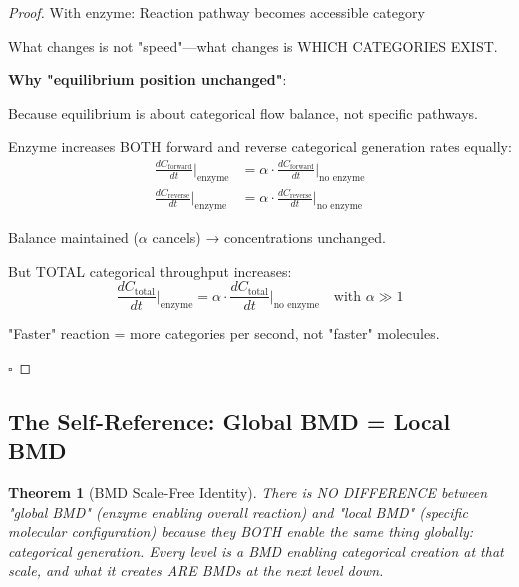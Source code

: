 \documentclass[12pt,a4paper]{article}
\newtheorem{theorem}{Theorem}[section]
\begin{document}
\begin{proof}
With enzyme: Reaction pathway becomes accessible category

What changes is not "speed"—what changes is WHICH CATEGORIES EXIST.

\textbf{Why "equilibrium position unchanged"}:

Because equilibrium is about categorical flow balance, not specific pathways.

Enzyme increases BOTH forward and reverse categorical generation rates equally:
\begin{align}
\frac{dC_{\text{forward}}}{dt}\Big|_{\text{enzyme}} &= \alpha \cdot \frac{dC_{\text{forward}}}{dt}\Big|_{\text{no enzyme}} \\
\frac{dC_{\text{reverse}}}{dt}\Big|_{\text{enzyme}} &= \alpha \cdot \frac{dC_{\text{reverse}}}{dt}\Big|_{\text{no enzyme}}
\end{align}

Balance maintained ($\alpha$ cancels) → concentrations unchanged.

But TOTAL categorical throughput increases:
\begin{equation}
\frac{dC_{\text{total}}}{dt}\Big|_{\text{enzyme}} = \alpha \cdot \frac{dC_{\text{total}}}{dt}\Big|_{\text{no enzyme}} \quad \text{with } \alpha \gg 1
\end{equation}

"Faster" reaction = more categories per second, not "faster" molecules.

$\square$
\end{proof}

\subsection{The Self-Reference: Global BMD = Local BMD}

\begin{theorem}[BMD Scale-Free Identity]
\label{thm:bmd_scale_free}
There is NO DIFFERENCE between "global BMD" (enzyme enabling overall reaction) and "local BMD" (specific molecular configuration) because they BOTH enable the same thing globally: categorical generation. Every level is a BMD enabling categorical creation at that scale, and what it creates ARE BMDs at the next level down.
\end{theorem}
\end{document}
